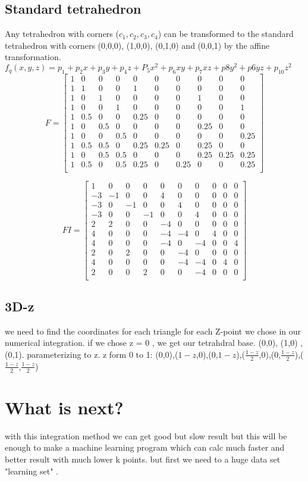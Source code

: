 \documentclass[11pt,a4paper]{article}
\begin{document}
\subsection{Standard tetrahedron}
Any tetrahedron with corners ({$c_1,c_2,c_3,c_4$}) can be transformed to the standard tetrahedron with corners (0,0,0), (1,0,0), (0,1,0) and (0,0,1) by the affine transformation.
$f_q (x,y,z) = p_1+ p_2x + p_3y+ p_4z +P_5x^2+p_6xy+p_7xz+p8y^2+ p6yz+ p_10 z^2$ \\
 \[
F =
  \begin{bmatrix}
  1 & 0 & 0 & 0 & 0 & 0 & 0 & 0 & 0 & 0 \\
  1 & 1 & 0 & 0 & 1 & 0 & 0 & 0 & 0 & 0 \\
  1 & 0 & 1 & 0 & 0 & 0 & 0 & 1 & 0 & 0 \\
 1 & 0 & 0 & 1 & 0 & 0 & 0 & 0 & 0 & 1 \\
 1 & 0.5 & 0 & 0 & 0.25 & 0 & 0 & 0 & 0 & 0 \\
 1 & 0 & 0.5 & 0& 0 & 0 & 0 & 0.25 & 0 & 0 \\
 1 & 0 & 0 & 0.5 & 0 & 0 & 0 & 0 & 0 & 0.25 \\
 1 & 0.5 & 0.5 & 0 & 0.25 & 0.25 & 0 & 0.25 & 0 & 0 \\
 1 & 0 & 0.5 & 0.5 & 0 & 0 & 0 & 0.25 & 0.25 & 0.25 \\
 1 & 0.5 & 0 & 0.5 & 0.25 & 0 & 0.25 & 0 & 0 & 0.25 \\
  \end{bmatrix}
\]

 \[
FI =
  \begin{bmatrix}
  1 & 0 & 0 & 0 & 0 & 0 & 0 & 0 & 0 & 0 \\
  -3 & -1 & 0 & 0 & 4 & 0 & 0 & 0 & 0 & 0 \\
  -3 & 0 & -1 & 0 & 0 & 4 & 0 & 0 & 0 & 0 \\
  -3 & 0 & 0  & -1& 0 & 0 & 4 & 0 & 0 & 0 \\
 2 & 2 & 0 & 0 & -4 & 0 & 0 & 0 & 0 & 0 \\
 4 & 0 & 0 & 0& -4 & -4 & 0 & 4 & 0 & 0 \\
 4 & 0 & 0 & 0 & -4 & 0 & -4 & 0 & 0 & 4 \\
 2 & 0 & 2 & 0 & 0 & -4 & 0 & 0 & 0 & 0 \\
 4 & 0 & 0 & 0 & 0 & -4 & -4 & 0 & 4 & 0 \\
 2 & 0 & 0 & 2 & 0 & 0 & -4 & 0 & 0 & 0 \\
  \end{bmatrix}
\]

 \subsection{3D-z}
we need to find the coordinates for each triangle for each Z-point we chose in our numerical integration.
if we chose z = 0 , we get our tetrahdral base. (0,0), (1,0) , (0,1).
parameterizing to z. z form 0 to 1:
(0,0),($1-z$,0),(0,$1-z$),($\frac{1-z}{2}$,0),(0,$\frac{1-z}{2}$),($\frac{1-z}{2}$,$\frac{1-z}{2}$)
\section{What is next?}
with this integration method we can get good but slow result but this will be enough to make a machine learning program which can calc much faster and better result with much lower k points. but first we need to a huge data set "learning set" .
\end{document}
